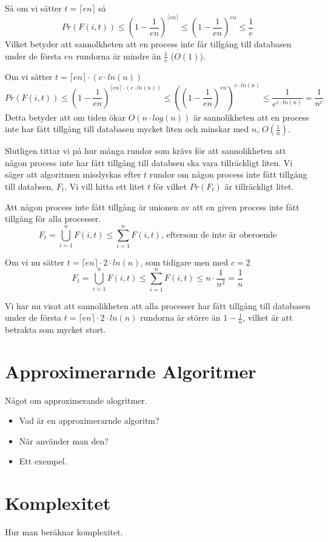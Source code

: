 \documentclass[a4paper]{report}
\begin{document}
Så om vi sätter $t = \lceil{}en\rceil$ så
\begin{equation}
	Pr(F(i,t)) \leq (1 - \frac{1}{en})^{\lceil{}en\rceil} \leq (1 -
	\frac{1}{en})^{en} \leq \frac{1}{e}
\end{equation}
Vilket betyder att sannolkheten att en process inte får tillgång till databasen
under de första $en$ rundorna är mindre än $\frac{1}{e}$ ($O(1)$).

Om vi sätter $t = \lceil{}en\rceil \cdot (c\cdot{}ln(n))$
\begin{equation}
	Pr(F(i,t)) \leq (1 - \frac{1}{en})^{\lceil{}en\rceil \cdot (c\cdot{}ln(n))}
	\leq ((1 - \frac{1}{en})^{en})^{c\cdot{}ln(n)} \leq
	\frac{1}{e^{c\cdot{}ln(n)}} = \frac{1}{n^c}
\end{equation}
Detta betyder att om tiden ökar $O(n\cdot{}log(n))$ är sannolikheten att en
process inte har fått tillgång till databasen mycket liten och minskar med $n$,
$O(\frac{1}{n})$.

Slutligen tittar vi på hur många rundor som krävs för att sannolikheten att
någon process inte har fått tillgång till databsen ska vara tillräckligt liten.
Vi säger att algoritmen misslyckas efter $t$ rundor om någon process inte fått
tillgång till databsen, $F_t$. Vi vill hitta ett litet $t$ för vilket $Pr(F_t)$
är tillräckligt litet.

Att någon process inte fått tillgång är unionen av att en given process inte
fått tillgång för alla processer.
\begin{equation}
	F_t = \bigcup_{i=1}^nF(i,t) \leq \sum_{i=1}^nF(i,t)\mbox{, eftersom de inte
	är oberoende}
\end{equation}

Om vi nu sätter $t = \lceil{}en\rceil \cdot 2\cdot{}ln(n)$, som tidigare men med $c = 2$
\begin{equation}
	F_t = \bigcup_{i=1}^nF(i,t) \leq \sum_{i=1}^nF(i,t) \leq n \cdot
	\frac{1}{n^2} =\frac{1}{n} 
\end{equation}

Vi har nu visat att sannolikheten att alla processer har fått tillgång till
databasen under de första $t = \lceil{}en\rceil \cdot 2\cdot{}ln(n)$ rundorna
är större än $1 - \frac{1}{n}$, vilket är att betrakta som mycket stort.


\section{Approximerarnde Algoritmer}

Något om approximerande alogritmer.
\begin{itemize}
	\item Vad är en approximerarnde algoritm?
	\item När använder man den?
	\item Ett exempel.
\end{itemize}

\section{Komplexitet}
Hur man beräknar komplexitet.
\end{document}

